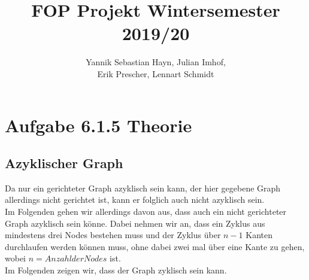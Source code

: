 \documentclass{article}
\title{FOP Projekt Wintersemester 2019/20}
\author{Yannik Sebastian Hayn, Julian Imhof,\\ Erik Prescher, Lennart Schmidt}
\begin{document}
\maketitle
\section{Aufgabe 6.1.5 Theorie}
\subsection{Azyklischer Graph}
Da nur ein gerichteter Graph azyklisch sein kann, der hier gegebene Graph allerdings nicht gerichtet ist, kann er folglich auch nicht azyklisch sein.\\
 Im Folgenden gehen wir allerdings davon aus, dass auch ein nicht gerichteter Graph azyklisch sein k\"onne. Dabei nehmen wir an, dass ein Zyklus aus mindestens drei Nodes bestehen muss und der Zyklus \"uber $n - 1$ Kanten durchlaufen werden k\"onnen muss, ohne dabei zwei mal \"uber eine Kante zu gehen, wobei $n = Anzahl der Nodes$ ist.\\
Im Folgenden zeigen wir, dass der Graph zyklisch sein kann.\\
\end{document}
